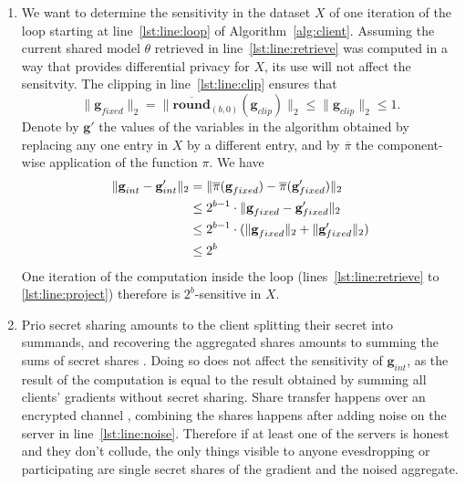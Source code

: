 \documentclass{article}
\begin{document}
\begin{enumerate}
\item We want to determine the sensitivity in the dataset $X$ of one iteration of the loop starting at line~\ref{lst:line:loop} of Algorithm~\ref{alg:client}. Assuming the current shared model $\theta$ retrieved in line~\ref{lst:line:retrieve} was computed in a way that provides differential privacy for $X$, its use will not affect the sensitvity. The clipping in line~\ref{lst:line:clip} ensures that 
\[\|\textbf{g}_{fixed}\|_2 = \|\overline{\textbf{round}}_{(b,0)}(\textbf{g}_{clip})\|_2\leq\|\textbf{g}_{clip}\|_2\leq 1.\]
Denote by $\textbf{g}'$ the values of the variables in the algorithm obtained by replacing any one entry in $X$ by a different entry, and by $\overline\pi$ the component-wise application of the function $\pi$. We have
\begin{align*}
\|\textbf g_{int} - \textbf g_{int}'\|_2 &= \|\overline\pi(\textbf g_{fixed}) - \overline \pi(\textbf g_{fixed}')\|_2 \\
&\leq 2^{b-1} \cdot \| \textbf g_{fixed}- \textbf g_{fixed}'\|_2\\
&\leq 2^{b-1} \cdot (\| \textbf g_{fixed}\|_2 + \|\textbf g_{fixed}'\|_2)\\
&\leq 2^b
\end{align*}
One iteration of the computation inside the loop (lines~\ref{lst:line:retrieve} to \ref{lst:line:project}) therefore is $2^b$-sensitive in $X$.

\item Prio secret sharing amounts to the client splitting their secret into summands, and recovering the aggregated shares amounts to summing the sums of secret shares \cite[Scheme on page 3]{prio}. Doing so does not affect the sensitivity of $\textbf{g}_{int}$, as the result of the computation is equal to the result obtained by summing all clients' gradients without secret sharing. Share transfer happens over an encrypted channel \cite[Step 1 of Scheme on page 3]{prio}, combining the shares happens after adding noise on the server in line~\ref{lst:line:noise}. Therefore if at least one of the servers is honest and they don't collude, the only things visible to anyone evesdropping or participating are single secret shares of the gradient and the noised aggregate.


\end{enumerate}
\end{document}
